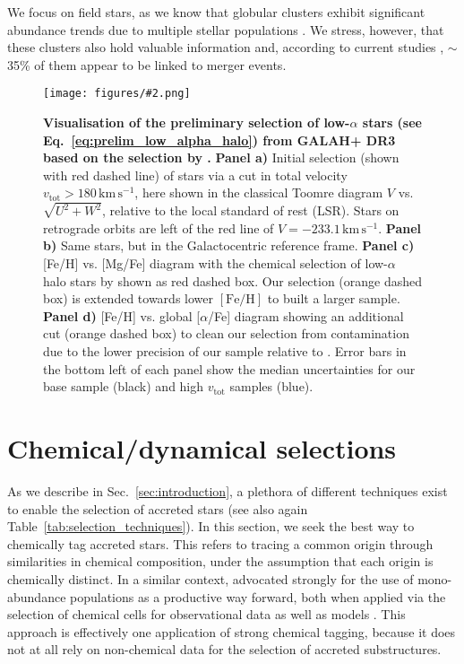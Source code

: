 \documentclass[fleqn,usenatbib]{mnras}
\newcommand{\kms}{\,\mathrm{km\,s^{-1}}}	%
\newcommand{\codeicon}{{\faCloudDownload}}
\newcommand{\codelink}[1]{\href{https://github.com/svenbuder/Accreted-stars-in-GALAH-DR3/tree/main/figures/#1.ipynb}{\codeicon}\,\,}
\newcommand{\oscaption}[2]{\caption{#2 \codelink{#1}}}
\newcommand{\figuretextwidth}[4]{\begin{figure*} \centering \texttt{[image: figures/\#2.png]}\oscaption{#3}{#4}\label{fig:#2} \end{figure*}}
\begin{document}
We focus on field stars, as we know that globular clusters exhibit significant abundance trends due to multiple stellar populations \citep[e.g.][]{Carretta2009}. We stress, however, that these clusters also hold valuable information and, according to current studies \citep[e.g.][]{Massari2019, KochHansen2021}, $\sim$35\% of them appear to be linked to merger events.

\figuretextwidth{17cm}{nissen_selection_corner}{chemical_differences}{
\textbf{Visualisation of the preliminary selection of low-$\alpha$ stars (see Eq.~\ref{eq:prelim_low_alpha_halo}) from GALAH+ DR3 based on the selection by \citet{Nissen2010}.}
\textbf{Panel a)} Initial selection (shown with red dashed line) of stars via a cut in total velocity $v_\text{tot} > 180\,\mathrm{km\,s^{-1}}$, here shown in the classical Toomre diagram $V$ vs. $\sqrt{U^2 + W^2}$, relative to the local standard of rest (LSR). Stars on retrograde orbits are left of the red line of $V = -233.1\kms$.
\textbf{Panel b)} Same stars, but in the Galactocentric reference frame.
\textbf{Panel c)} [Fe/H] vs. [Mg/Fe] diagram with the chemical selection of low-$\alpha$ halo stars by \citet{Nissen2010} shown as red dashed box. Our selection (orange dashed box) is extended towards lower $\mathrm{[Fe/H]}$ to built a larger sample.
\textbf{Panel d)} [Fe/H] vs. global [$\alpha$/Fe] diagram showing an additional cut (orange dashed box) to clean our selection from contamination due to the lower precision of our sample relative to \citet{Nissen2010}.
Error bars in the bottom left of each panel show the median uncertainties for our base sample (black) and high $v_\text{tot}$ samples (blue).
}

\section{Chemical/dynamical selections} \label{sec:our_selection_techniques}

As we describe in Sec.~\ref{sec:introduction}, a plethora of different techniques exist to enable the selection of accreted stars (see also again Table~\ref{tab:selection_techniques}). In this section, we seek the best way to chemically tag \citep{FreemanBlandHawthorn2002, Ting2015} accreted stars. This refers to tracing a common origin through similarities in chemical composition, under the assumption that each origin is chemically distinct. In a similar context, \citet{Rix2013} advocated strongly for the use of mono-abundance populations as a productive way forward, both when applied via the selection of chemical cells \citep{Ting2015, Lu2021} for observational data \citep[e.g.][]{Bovy2012, Bovy2012b, Bovy2016} as well as models \citep[e.g.][]{Ting2013,Bird2013, Minchev2017}. This approach is effectively one application of strong chemical tagging, because it does not at all rely on non-chemical data for the selection of accreted substructures.
\end{document}
